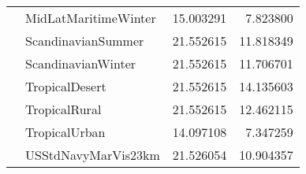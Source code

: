\begin{tabular}{llrr}
             & MidLatMaritimeWinter &  15.003291 &   7.823800 \\
             & ScandinavianSummer &  21.552615 &  11.818349 \\
             & ScandinavianWinter &  21.552615 &  11.706701 \\
             & TropicalDesert &  21.552615 &  14.135603 \\
             & TropicalRural &  21.552615 &  12.462115 \\
             & TropicalUrban &  14.097108 &   7.347259 \\
             & USStdNavyMarVis23km &  21.526054 &  10.904357 \\
\bottomrule
\end{tabular}


